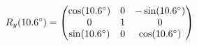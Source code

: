\documentclass[preview]{standalone}
\begin{document}
\begin{align*}
\special{dvisvgm:raw <g id='unique000'>}R_y(10.6^\circ) = \begin{pmatrix} \cos(10.6^\circ) & 0 & -\sin(10.6^\circ) \\ 0 & 1 & 0 \\ \sin(10.6^\circ) & 0 & \cos(10.6^\circ) \end{pmatrix}\special{dvisvgm:raw </g>}
\end{align*}
\end{document}
